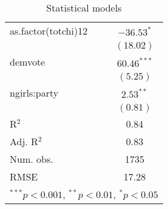 \documentclass{article}
\begin{document}
\begin{table}
\begin{center}
\begin{tabular}{l c }
as.factor(totchi)12 & $-36.53^{*}$   \\
                    & $(18.02)$      \\
demvote             & $60.46^{***}$  \\
                    & $(5.25)$       \\
ngirls:party        & $2.53^{**}$    \\
                    & $(0.81)$       \\
\hline
R$^2$               & 0.84           \\
Adj. R$^2$          & 0.83           \\
Num. obs.           & 1735           \\
RMSE                & 17.28          \\
\hline
\multicolumn{2}{l}{\scriptsize{$^{***}p<0.001$, $^{**}p<0.01$, $^*p<0.05$}}
\end{tabular}
\caption{Statistical models}
\label{table:coefficients}
\end{center}
\end{table}
\end{document}
